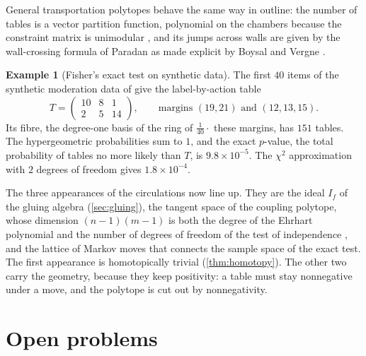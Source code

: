 \documentclass[11pt]{article}
\theoremstyle{definition}
\newtheorem{example}[theorem]{Example}
\theoremstyle{remark}
\begin{document}
General transportation polytopes behave the same way in outline: the number of tables is a vector partition function,
polynomial on the chambers because the constraint matrix is unimodular \cite{Sturmfels1995}, and its jumps across walls are
given by the wall-crossing formula of Paradan as made explicit by Boysal and Vergne \cite{BoysalVergne2009}.

\begin{example}[Fisher's exact test on synthetic data]\label{ex:fisher}
The first $40$ items of the synthetic moderation data of \cite[\S12]{Conditionals} give the label-by-action table
\[
T=\begin{pmatrix}10&8&1\\2&5&14\end{pmatrix},\qquad\text{margins }(19,21)\text{ and }(12,13,15).
\]
Its fibre, the degree-one basis of the ring of $\frac1{40}\cdot$ these margins, has $151$ tables. The hypergeometric probabilities sum
to $1$, and the exact $p$-value, the total probability of tables no more likely than $T$, is $9.8\times10^{-5}$. The
$\chi^2$ approximation with $2$ degrees of freedom gives $1.8\times10^{-4}$.
\end{example}

The three appearances of the circulations now line up. They are the ideal $I_f$ of the gluing algebra (\cref{sec:gluing}),
the tangent space of the coupling polytope, whose dimension $(n-1)(m-1)$ is both the degree of the Ehrhart polynomial and
the number of degrees of freedom of the test of independence \cite[Prop.~12.1]{Conditionals}, and the lattice of Markov moves
that connects the sample space of the exact test. The first appearance is homotopically trivial (\cref{thm:homotopy}). The
other two carry the geometry, because they keep positivity: a table must stay nonnegative under a move, and the polytope
is cut out by nonnegativity.

\section{Open problems}\label{sec:open}
\end{document}
